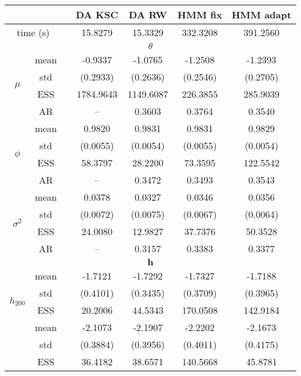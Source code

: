{ \renewcommand{\arraystretch}{1.2} 
\begin{table} 
\center 
\begin{tabular}{ccc cc cc} 
\hline 
 & && DA KSC & DA RW & HMM fix & HMM adapt \\ \hline  \hline
 \multicolumn{2}{c}{time (s)}& & 15.8279  & 15.3329  & 332.3208  & 391.2560  \\  \hline 
\multicolumn{7}{c}{$\theta$} \\ \hline 
\multirow{4}{*}{$\mu$}   & mean  &   & -0.9337  & -1.0765  & -1.2508  & -1.2393  \\ [0.75ex]
 & std  &   & (0.2933)  & (0.2636)  & (0.2546)  & (0.2705)  \\ [0.75ex]
 & ESS  &   & 1784.9643  & 1149.6087  & 226.3855  & 285.9039  \\ [0.75ex]
 & AR && --  & 0.3603  & 0.3764  & 0.3540  \\ [1.3ex] 
\multirow{4}{*}{$\phi$}   & mean  &   & 0.9820  & 0.9831  & 0.9831  & 0.9829  \\ [0.75ex]
 & std  &   & (0.0055)  & (0.0054)  & (0.0055)  & (0.0054)  \\ [0.75ex]
 & ESS  &   & 58.3797  & 28.2200  & 73.3595  & 122.5542  \\ [0.75ex]
 & AR && --  & 0.3472  & 0.3493  & 0.3543  \\ [1.3ex] 
\multirow{4}{*}{$\sigma^2$}   & mean  &   & 0.0378  & 0.0327  & 0.0346  & 0.0356  \\ [0.75ex]
 & std  &   & (0.0072)  & (0.0075)  & (0.0067)  & (0.0064)  \\ [0.75ex]
 & ESS  &   & 24.0080  & 12.9827  & 37.7376  & 50.3528  \\ [0.75ex]
 & AR && --  & 0.3157  & 0.3383  & 0.3377  \\ [1.3ex] 
\hline 
\multicolumn{7}{c}{$ \bm{h} $} \\ \hline 
\multirow{4}{*}{$h_{200}$}   & mean &   & -1.7121  & -1.7292  & -1.7327  & -1.7188  \\ [0.75ex]
 & std &   & (0.4101)  & (0.3435)  & (0.3709)  & (0.3965)  \\ [0.75ex]
 & ESS  &   & 20.2006  & 44.5343  & 170.0508  & 142.9184  \\ [1.3ex] 
\multirow{4}{*}{$h_{600}$}   & mean &   & -2.1073  & -2.1907  & -2.2202  & -2.1673  \\ [0.75ex]
 & std &   & (0.3884)  & (0.3956)  & (0.4011)  & (0.4175)  \\ [0.75ex]
 & ESS  &   & 36.4182  & 38.6571  & 140.5668  & 45.8781  \\ [1.3ex] 

\end{tabular}
\end{table}}
